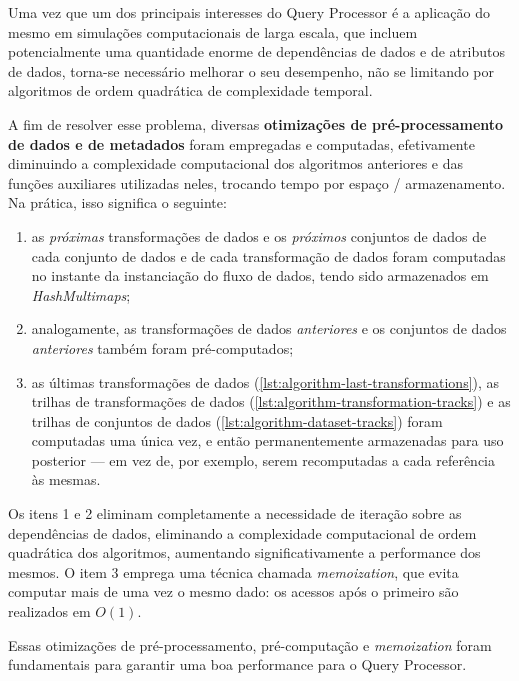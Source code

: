Uma vez que um dos principais interesses do Query Processor é a aplicação do mesmo em simulações computacionais de larga escala, que incluem potencialmente uma quantidade enorme de dependências de dados e de atributos de dados, torna-se necessário melhorar o seu desempenho, não se limitando por algoritmos de ordem quadrática de complexidade temporal.

A fim de resolver esse problema, diversas \textbf{otimizações de pré-processamento de dados e de metadados} foram empregadas e computadas, efetivamente diminuindo a complexidade computacional dos algoritmos anteriores e das funções auxiliares utilizadas neles, trocando tempo por espaço / armazenamento. Na prática, isso significa o seguinte:

\begin{enumerate}
    \item as \emph{próximas} transformações de dados e os \emph{próximos} conjuntos de dados de cada conjunto de dados e de cada transformação de dados foram computadas no instante da instanciação do fluxo de dados, tendo sido armazenados em \textit{HashMultimaps}; 
    \item analogamente, as transformações de dados \emph{anteriores} e os conjuntos de dados \emph{anteriores} também foram pré-computados;
    \item as últimas transformações de dados (\autoref{lst:algorithm-last-transformations}), as trilhas de transformações de dados (\autoref{lst:algorithm-transformation-tracks}) e as trilhas de conjuntos de dados (\autoref{lst:algorithm-dataset-tracks}) foram computadas uma única vez, e então permanentemente armazenadas para uso posterior --- em vez de, por exemplo, serem recomputadas a cada referência às mesmas.
\end{enumerate}

Os itens 1 e 2 eliminam completamente a necessidade de iteração sobre as dependências de dados, eliminando a complexidade computacional de ordem quadrática dos algoritmos, aumentando significativamente a performance dos mesmos. O item 3 emprega uma técnica chamada \textit{memoization}, que evita computar mais de uma vez o mesmo dado: os acessos após o primeiro são realizados em \(O(1)\).

Essas otimizações de pré-processamento, pré-computação e \textit{memoization} foram fundamentais para garantir uma boa performance para o Query Processor.

